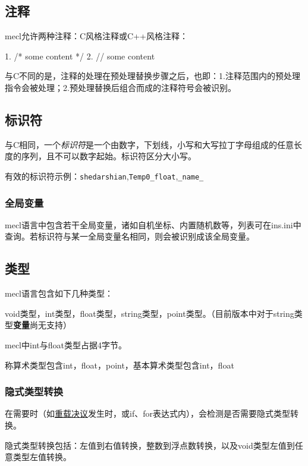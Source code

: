 \documentclass[UTF8]{ctexart}
\begin{document}
\subsection{注释}

mecl允许两种注释：C风格注释或C++风格注释：

\begin{MUAvbt}
1. /* some content */
2. // some content \n
\end{MUAvbt}

与C不同的是，注释的处理在预处理替换步骤之后，也即：1.注释范围内的预处理指令会被处理；2.预处理替换后组合而成的注释符号会被识别。

\subsection{标识符}

与C相同，一个\textit{标识符}是一个由数字，下划线，小写和大写拉丁字母组成的任意长度的序列，且不可以数字起始。标识符区分大小写。

有效的标识符示例：\verb|shedarshian|,\verb|Temp0_float|,\verb|_name_|

\subsubsection{全局变量}

mecl语言中包含若干全局变量，诸如自机坐标、内置随机数等，列表可在ins.ini中查询。若标识符与某一全局变量名相同，则会被识别成该全局变量。

\subsection{类型}

mecl语言包含如下几种类型：

void类型，int类型，float类型，string类型，point类型。（目前版本中对于string类型\textbf{变量}尚无支持）

mecl中int与float类型占据4字节。

称算术类型包含int，float，point，基本算术类型包含int，float

\subsubsection{隐式类型转换}

在需要时（如\hyperref[chongzai]{重载决议}发生时，或if、for表达式内），会检测是否需要隐式类型转换。

隐式类型转换包括：左值到右值转换，整数到浮点数转换，以及void类型左值到任意类型左值转换。
\end{document}
